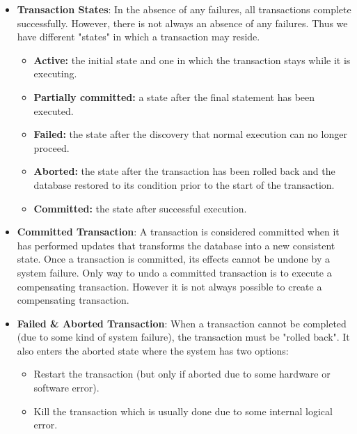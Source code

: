 \documentclass{report}
\begin{document}
\begin{itemize}
        \item \textbf{Transaction States}: In the absence of any failures, all transactions complete successfully.
            \bigbreak \noindent 
            However, there is not always an absence of any failures.
            \bigbreak \noindent 
            Thus we have different "states" in which a transaction may reside.
            \bigbreak \noindent 
            \begin{itemize}
                \item \textbf{Active:} the initial state and one in which the transaction stays while it is executing.
                \item \textbf{Partially committed:} a state after the final statement has been executed.
                \item \textbf{Failed:} the state after the discovery that normal execution can no longer proceed.
                \item \textbf{Aborted:} the state after the transaction has been rolled back and the database restored to its condition prior to the start of the transaction.
                \item \textbf{Committed:} the state after successful execution.
            \end{itemize}
        \item \textbf{Committed Transaction}:
            A transaction is considered committed when it has performed updates that transforms the database into a new consistent state.
            \bigbreak \noindent 
            Once a transaction is committed, its effects cannot be undone by a system failure.
            \bigbreak \noindent 
            Only way to undo a committed transaction is to execute a compensating transaction.
            \bigbreak \noindent 
            However it is not always possible to create a compensating transaction.
        \item \textbf{Failed \& Aborted Transaction}: When a transaction cannot be completed (due to some kind of system failure), the transaction must be "rolled back".
            \bigbreak \noindent 
             It also enters the aborted state where the system has two options:
             \begin{itemize}
                 \item Restart the transaction (but only if aborted due to some hardware or software error).
                 \item Kill the transaction which is usually done due to some internal logical error.

\end{itemize}
\end{itemize}
\end{document}
